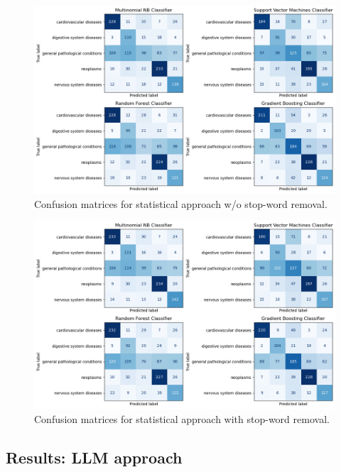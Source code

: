 \begin{figure}[ht]
    \centering
    \includegraphics[width=\columnwidth]{report/figures/conf-matrices-stat-wo.png}
    \caption{Confusion matrices for statistical approach w/o stop-word removal.}
    \label{fig:conf-matrices-stat-wo}
\end{figure}
\vspace{-1em}
\begin{figure}[ht]
    \centering
    \includegraphics[width=\columnwidth]{report/figures/conf-matrices-stat.png}
    \caption{Confusion matrices for statistical approach with stop-word removal.}
    \label{fig:conf-matrices-stat}
\end{figure}

\subsection{Results: LLM approach}
\label{subsec:results-stat-appoach}

